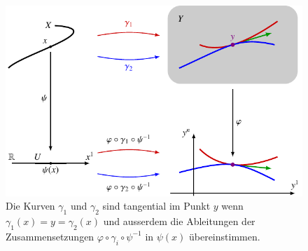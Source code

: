 %
%
%
\begin{figure}
\centering
\includegraphics{chapters/020-koordinaten/images/kurve.pdf}
\caption{Die Kurven $\gamma_1$ und $\gamma_2$ sind tangential im
Punkt $y$ wenn $\gamma_1(x)=y=\gamma_2(x)$ und ausserdem die
Ableitungen der Zusammensetzungen $\varphi\circ\gamma_i\circ\psi^{-1}$
in $\psi(x)$ übereinstimmen.
\label{buch:koordinaten:tangentialvektoren:fig:kurve}}
\end{figure}
